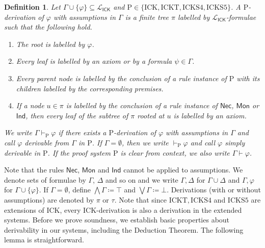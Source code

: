 \documentclass{myifcolog}
\newcommand{\ICK}{\mathsf{ICK}}
\newcommand{\LICK}{\mathcal{L}_{\ICK}}
\newcommand{\hick}{\mathrm{ICK}}
\newcommand{\hickt}{\mathrm{ICKT}}
\newcommand{\hicks}{\mathrm{ICKS4}}
\newcommand{\hickss}{\mathrm{ICKS5}}
\newcommand{\hickp}{\mathrm{P}}
\newtheorem{definition}[theorem]{Definition}
\numberwithin{theorem}{section}
\begin{document}
\begin{definition}
    Let $\Gamma \cup \{\varphi\} \subseteq \LICK$ and $\hickp \in \{ \hick, \hickt, \hicks, \hickss\}$. A \emph{$\hickp$-derivation of $\varphi$ with assumptions in $\Gamma$} is a finite tree $\pi$ labelled by $\LICK$-formulae such that the following hold.
    \begin{enumerate}
    \item The root is labelled by $\varphi$.
        \item Every leaf is labelled by an axiom or by a formula $\psi \in \Gamma$.
        \item Every parent node is labelled by the conclusion of a rule instance of $\hickp$ with its children labelled by the corresponding premises.
        \item If a node $u \in \pi$ is labelled by the conclusion of a rule instance of $\mathsf{Nec}$, $\mathsf{Mon}$ or $\mathsf{Ind}$, then every leaf of the subtree of $\pi$ rooted at $u$ is labelled by an axiom.
    \end{enumerate}
    We write $\Gamma \vdash_\mathrm{P} \varphi$ if there exists a $\hickp$-derivation of $\varphi$ with assumptions in $\Gamma$ and call $\varphi$ \emph{derivable from $\Gamma$ in $\hickp$}. If $\Gamma = \emptyset$, then we write $\vdash_\mathrm{P} \varphi$ and call $\varphi$ simply \emph{derivable in $\hickp$}. If the proof system $\mathrm{P}$ is clear from context, we also write $\Gamma \vdash \varphi$.
\end{definition}

Note that the rules $\mathsf{Nec}$, $\mathsf{Mon}$ and $\mathsf{Ind}$ cannot be applied to assumptions. We denote sets of formulae by $\Gamma$, $\Delta$ and so on and we write $\Gamma, \Delta$ for $\Gamma \cup \Delta$ and $\Gamma, \varphi$ for $\Gamma \cup \{\varphi\}$. If $\Gamma= \emptyset$, define $\bigwedge \Gamma \coloneqq \top$ and $\bigvee \Gamma \coloneqq \bot$. Derivations (with or without assumptions) are denoted by $\pi$ or $\tau$. Note that since $\hickt, \hicks$ and $\hickss$ are extensions of $\hick$, every $\hick$-derivation is also a derivation in the extended systems. %
Before we prove soundness, we establish basic properties about derivability in our systems, including the Deduction Theorem. The following lemma is straightforward.
\end{document}
